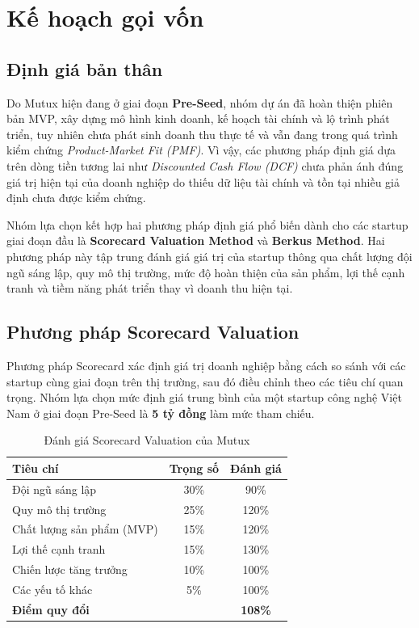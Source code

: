 \section{Kế hoạch gọi vốn}

\subsection{Định giá bản thân}

Do Mutux hiện đang ở giai đoạn \textbf{Pre-Seed}, nhóm dự án đã hoàn thiện phiên bản MVP, xây dựng mô hình kinh doanh, kế hoạch tài chính và lộ trình phát triển, tuy nhiên chưa phát sinh doanh thu thực tế và vẫn đang trong quá trình kiểm chứng \textit{Product-Market Fit (PMF)}. Vì vậy, các phương pháp định giá dựa trên dòng tiền tương lai như \textit{Discounted Cash Flow (DCF)} chưa phản ánh đúng giá trị hiện tại của doanh nghiệp do thiếu dữ liệu tài chính và tồn tại nhiều giả định chưa được kiểm chứng.

Nhóm lựa chọn kết hợp hai phương pháp định giá phổ biến dành cho các startup giai đoạn đầu là \textbf{Scorecard Valuation Method} và \textbf{Berkus Method}. Hai phương pháp này tập trung đánh giá giá trị của startup thông qua chất lượng đội ngũ sáng lập, quy mô thị trường, mức độ hoàn thiện của sản phẩm, lợi thế cạnh tranh và tiềm năng phát triển thay vì doanh thu hiện tại.

\subsection{Phương pháp Scorecard Valuation}

Phương pháp Scorecard xác định giá trị doanh nghiệp bằng cách so sánh với các startup cùng giai đoạn trên thị trường, sau đó điều chỉnh theo các tiêu chí quan trọng. Nhóm lựa chọn mức định giá trung bình của một startup công nghệ Việt Nam ở giai đoạn Pre-Seed là \textbf{5 tỷ đồng} làm mức tham chiếu.

\begin{table}[H]
\centering
\caption{Đánh giá Scorecard Valuation của Mutux}
\begin{tabular}{lcc}
\toprule
\textbf{Tiêu chí} & \textbf{Trọng số} & \textbf{Đánh giá} \\
\midrule
Đội ngũ sáng lập & 30\% & 90\% \\
Quy mô thị trường & 25\% & 120\% \\
Chất lượng sản phẩm (MVP) & 15\% & 120\% \\
Lợi thế cạnh tranh & 15\% & 130\% \\
Chiến lược tăng trưởng & 10\% & 100\% \\
Các yếu tố khác & 5\% & 100\% \\
\midrule
\textbf{Điểm quy đổi} & & \textbf{108\%} \\
\bottomrule
\end{tabular}
\end{table}

